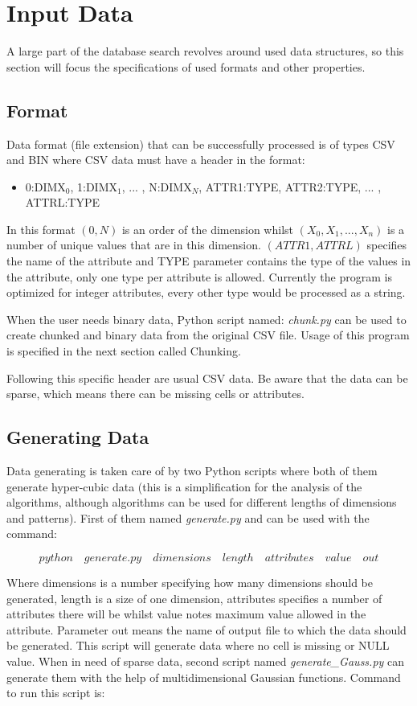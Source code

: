 \section{Input Data}
A large part of the database search revolves around used data structures, so this section will focus the specifications of used formats and other properties.

\subsection{Format}
Data format (file extension) that can be successfully processed is of types CSV and BIN where CSV data must have a header in the format:
\begin{itemize}
\item 0:DIMX$_0$, 1:DIMX$_1$, ... , N:DIMX$_N$, ATTR1:TYPE, ATTR2:TYPE, ... , ATTRL:TYPE
\end{itemize}
In this format $(0, N)$ is an order of the dimension whilst $(X_0, X_1, ... , X_n)$ is a number of unique values that are in this dimension. $(ATTR1, ATTRL)$ specifies the name of the attribute and TYPE parameter contains the type of the values in the attribute, only one type per attribute is allowed. Currently the program is optimized for integer attributes, every other type would be processed as a string.

When the user needs binary data, Python script named: \textit{chunk.py} can be used to create chunked and binary data from the original CSV file. Usage of this program is specified in the next section called Chunking.

Following this specific header are usual CSV data. Be aware that the data can be sparse, which means there can be missing cells or attributes.

\subsection{Generating Data}
Data generating is taken care of by two Python scripts where both of them generate hyper-cubic data (this is a simplification for the analysis of the algorithms, although algorithms can be used for different lengths of dimensions and patterns). First of them named \textit{generate.py} and can be used with the command:

$$ python\quad generate.py\quad dimensions\quad length\quad attributes\quad value\quad out$$

Where dimensions is a number specifying how many dimensions should be generated, length is a size of one dimension, attributes specifies a number of attributes there will be whilst value notes maximum value allowed in the attribute. Parameter out means the name of output file to which the data should be generated. This script will generate data where no cell is missing or NULL value.
When in need of sparse data, second script named \textit{generate\_Gauss.py} can generate them with the help of multidimensional Gaussian functions. Command to run this script is: 

